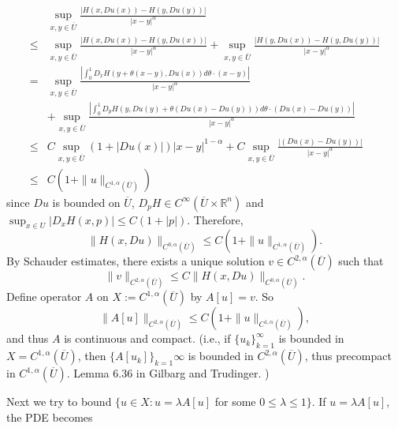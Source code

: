 \documentclass[11pt,reqno]{amsart}
\numberwithin{figure}{section}
\theoremstyle{plain}
\theoremstyle{remark}
\numberwithin{equation}{section}
\begin{document}
\begin{appendices}
\begin{equation}
    \begin{aligned}
  &\sup_{x, y \in \overline{U}}\frac{|H(x, Du(x))-H(y, Du(y))|}{|x-y|^\alpha}\\
  \leq &  \sup_{x, y \in \overline{U}}\frac{|H(x, Du(x))-H(y, Du(x))|}{|x-y|^\alpha} + \sup_{x, y \in \overline{U}}\frac{|H(y, Du(x))-H(y, Du(y))|}{|x-y|^\alpha} \\
  =&    \sup_{x, y \in \overline{U}}\frac{|\int_0^1D_xH(y+\theta (x-y), Du(x))d\theta \cdot (x-y)|}{|x-y|^\alpha}\\& +
     \sup_{x, y \in \overline{U}}\frac{|\int_0^1D_pH(y, Du(y)+\theta (Du(x)-Du(y)))d\theta \cdot (Du(x)-Du(y))|}{|x-y|^\alpha}\\
  \leq &  C\sup_{x, y \in \overline{U}} (1+|Du(x)|)|x-y|^{1-\alpha} +  C \sup_{x, y \in \overline{U}}\frac{| (Du(x)-Du(y))|}{|x-y|^\alpha}\\
 \leq & C(1 + \|u\|_{C^{1,\alpha}(\overline{U})})
    \end{aligned}
\end{equation}
since $Du$ is bounded on $\overline{U}$, $D_pH \in C^\infty (\overline{U} \times \mathbb{R}^n)$ and
$\displaystyle \sup_{x\in U}|D_xH(x,p)|\leq C(1+|p|)$. Therefore,
\begin{equation}
 \|H(x, Du)\|_{C^{0, \alpha}(\overline{U})} \leq C(1 + \|u\|_{C^{1,\alpha}(\overline{U})}).
\end{equation}
By Schauder estimates, there exists a unique solution $v \in C^{2,\alpha }(\overline{U})$ such that
\begin{equation}
\label{schauder}
    \|v\|_{C^{2, \alpha}(\overline{U})} \leq C  \|H(x, Du)\|_{C^{0, \alpha}(\overline{U})}. 
\end{equation}
\noindent Define operator $A$ on $X := C^{1, \alpha} (\overline{U}) $ by $A[u]=v$. So 
\begin{equation}
     \|A[u]\|_{C^{2, \alpha}(\overline{U})} \leq C(1 + \|u\|_{C^{1,\alpha}(\overline{U})}),
\end{equation}
\noindent
 and thus $A$ is continuous and compact. (i.e., if $\{u_k\}_{k=1}^\infty$ is bounded in $X=C^{1, \alpha}(\overline{U})$, then $\{A[u_k]\}_{k=1}\infty$ is bounded in $C^{2,\alpha} (\overline{U})$, thus precompact in $C^{1, \alpha}(\overline{U})$. Lemma 6.36 in Gilbarg and Trudinger. )
 
\noindent Next we try to bound $\{u\in X : u=\lambda A[u]$ for some $0 \leq  \lambda \leq 1\}$. If $u=\lambda A[u]$, the PDE becomes
 

\end{appendices}
\end{document}
